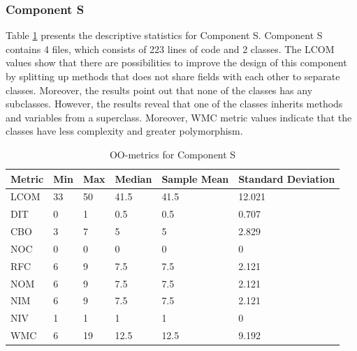 \subsubsection{Component S}
Table \ref{tab:oometrics-sys} presents the descriptive statistics for Component S. Component S contains 4 files, which consists of 223 lines of code and 2 classes. The LCOM values show that there are possibilities to improve the design of this component by splitting up methods that does not share fields with each other to separate classes. Moreover, the results point out that none of the classes has any subclasses. However, the results reveal that one of the classes inherits methods and variables from a superclass. Moreover, WMC metric values indicate that the classes have less complexity and greater polymorphism.

\begin{table}[]
\centering
\caption{OO-metrics for Component S}
\label{tab:oometrics-sys}
\begin{tabular}{|l|l|l|l|l|l|}
\hline
\textbf{Metric} & \textbf{Min} & \textbf{Max} & \textbf{Median} & \textbf{Sample Mean} & \textbf{Standard Deviation} \\ \hline
LCOM            & 33           & 50           & 41.5            & 41.5                 & 12.021                      \\ \hline
DIT             & 0            & 1            & 0.5             & 0.5                  & 0.707                       \\ \hline
CBO             & 3            & 7            & 5             & 5                  & 2.829                       \\ \hline
NOC             & 0            & 0            & 0               & 0                    & 0                           \\ \hline
RFC             & 6            & 9            & 7.5             & 7.5                  & 2.121                       \\ \hline
NOM             & 6            & 9            & 7.5             & 7.5                  & 2.121                       \\ \hline
NIM             & 6            & 9            & 7.5             & 7.5                  & 2.121                       \\ \hline
NIV             & 1            & 1            & 1               & 1                    & 0                           \\ \hline
WMC            & 6           & 19            & 12.5            & 12.5                 & 9.192                         \\ \hline
\end{tabular}
\end{table}

